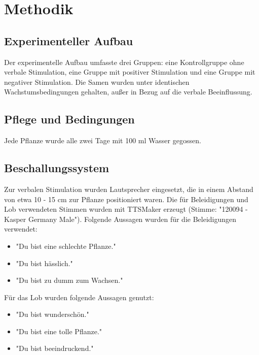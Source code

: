 
\section{Methodik}
\subsection{Experimenteller Aufbau}
Der experimentelle Aufbau umfasste drei Gruppen: eine Kontrollgruppe ohne verbale Stimulation, eine Gruppe mit positiver Stimulation und eine Gruppe mit negativer Stimulation. Die Samen wurden unter identischen Wachstumsbedingungen gehalten, außer in Bezug auf die verbale Beeinflussung.

\subsection{Pflege und Bedingungen}
Jede Pflanze wurde alle zwei Tage mit 100 ml Wasser gegossen.

\subsection{Beschallungssystem}
Zur verbalen Stimulation wurden Lautsprecher eingesetzt, die in einem Abstand von etwa 10 - 15 cm zur Pflanze positioniert waren. Die für Beleidigungen und Lob verwendeten Stimmen wurden mit TTSMaker erzeugt (Stimme: "120094 - Kasper Germany Male"). \cite{ttsmaker} Folgende Aussagen wurden für die Beleidigungen verwendet:
\begin{itemize}
    \item "Du bist eine schlechte Pflanze."
    \item "Du bist hässlich."
    \item "Du bist zu dumm zum Wachsen."
\end{itemize}
Für das Lob wurden folgende Aussagen genutzt:
\begin{itemize}
    \item "Du bist wunderschön."
    \item "Du bist eine tolle Pflanze."
    \item "Du bist beeindruckend."
\end{itemize}

